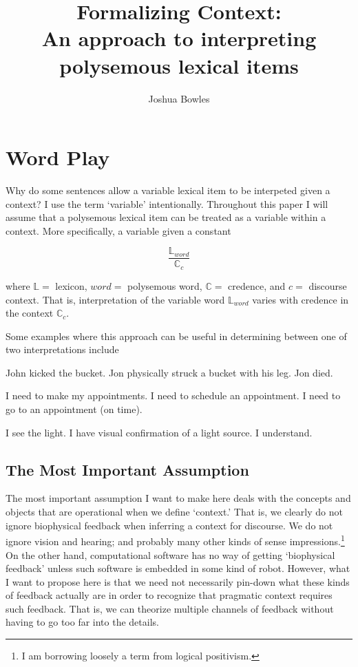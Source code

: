 \documentclass{article}
\begin{document}
    
\title{Formalizing Context:\\ An approach to interpreting polysemous lexical items}

\author{Joshua Bowles\\ }

\maketitle
\tableofcontents

\section{Word Play}
Why do some sentences allow a variable lexical item to be interpeted given a context? I use the term `variable' intentionally. Throughout this paper I will assume that a polysemous lexical item can be treated as a variable within a context. More specifically, a variable given a constant

\begin{equation}
  \frac{\mathbb{L}_{word}}{\mathbb{C}_c}
\end{equation} 

where $\mathbb{L}=$ lexicon, $word=$ polysemous word, $\mathbb{C}=$ credence, and $c=$ discourse context. That is, interpretation of the variable word $\mathbb{L}_{word}$ varies with credence in the context $\mathbb{C}_c$. 

Some examples where this approach can be useful in determining between one of two interpretations include

 \pex John kicked the bucket.\label{kick}
    \a Jon physically struck a bucket with his leg.
    \a Jon died.
\xe

\pex I need to make my appointments.
    \a I need to schedule an appointment.
    \a I need to go to an appointment (on time).
\xe

\pex I see the light.
    \a I have visual confirmation of a light source.
    \a I understand.
\xe

\subsection{The Most Important Assumption}
The most important assumption I want to make here deals with the concepts and objects that are operational when we define `context.' That is, we clearly do not ignore biophysical feedback when inferring a context for discourse. We do not ignore vision and hearing; and probably many other kinds of sense impressions.\footnote{I am borrowing loosely a term from logical positivism.} On the other hand, computational software has no way of getting `biophysical feedback' unless such software is embedded in some kind of robot. However, what I want to propose here is that we need not necessarily pin-down what these kinds of feedback actually are in order to recognize that pragmatic context requires such feedback. That is, we can theorize multiple channels of feedback without having to go too far into the details.
\end{document}
